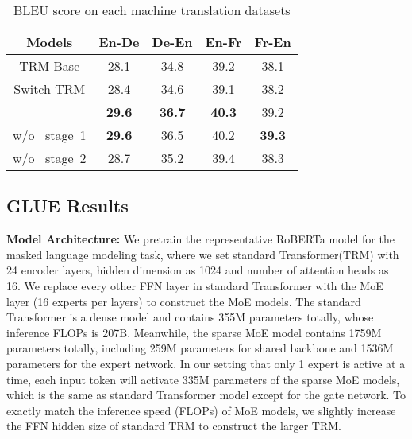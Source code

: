 \begin{table}[t]
    \caption{BLEU score on each machine translation datasets}
        \begin{center}
            \begin{tabular}{c|cccc}
            \toprule 
            \textbf{Models}
            & \textbf{En-De} & \textbf{De-En} & \textbf{En-Fr} & \textbf{Fr-En}\\ 
            \midrule
            {TRM-Base}  
            & {28.1} &{34.8}
            & {39.2} &{38.1}\\
            {Switch-TRM}
            & {28.4} &{34.6}  
            & {39.1} &{38.2} \\
            \midrule
            {\evomoe{}} 
            & {\textbf{29.6}} &{\textbf{36.7}}
            & {\textbf{40.3}} &{39.2} \\
            {\quad\quad\quad\quad w/o \ stage\ 1}  
            & {\textbf{29.6}} &{36.5}  
            & {40.2} &{\textbf{39.3}} \\
            {\quad\quad\quad\quad w/o \ stage\ 2}  
            & {28.7} &{35.2}  
            & {39.4} &{38.3} \\
            \bottomrule
            \end{tabular}
        \end{center}
\label{tab:trans_tasks}
\end{table}

\subsection{GLUE Results}
\textbf{Model Architecture:} We pretrain the representative RoBERTa model for the masked language modeling task, where we set standard Transformer(TRM) with 24 encoder layers, hidden dimension as 1024 and number of attention heads as 16. We replace every other FFN layer in standard Transformer with the MoE layer (16 experts per layers) to construct the MoE models.  The standard Transformer is a dense model and contains 355M parameters totally, whose inference FLOPs is 207B. Meanwhile, the sparse MoE model contains 1759M parameters totally, including 259M parameters for shared backbone and 1536M parameters for the expert network. In our setting that only 1 expert is active at a time, each input token will activate 335M parameters of the sparse MoE models, which is the same as standard Transformer model except for the gate network. To exactly match the inference speed (FLOPs) of MoE models, we slightly increase the FFN hidden size of standard TRM to construct the larger TRM.

